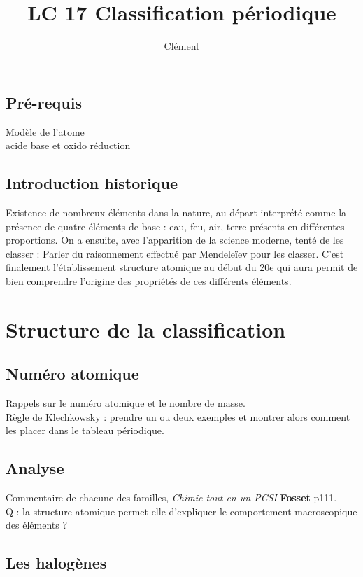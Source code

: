 \documentclass[12pt,prb,aps,epsf]{article}
\begin{document}
	
	\title{LC 17 Classification périodique}
	\author{Clément}
	
	\maketitle
	
	\tableofcontents
	
	\pagebreak
	
	
\subsection{Pré-requis}
Modèle de l'atome\\
acide base et oxido réduction

\subsection{Introduction historique}
Existence de nombreux éléments dans la nature, au départ interprété comme la présence de quatre éléments de base : eau, feu, air, terre présents en différentes proportions. On a ensuite, avec l'apparition de la science moderne, tenté de les classer : Parler du raisonnement effectué par Mendeleïev pour les classer. C'est finalement l'établissement structure atomique au début du 20e qui aura permit de bien comprendre l'origine des propriétés de ces différents éléments.

\section{Structure de la classification}
\subsection{Numéro atomique}
Rappels sur le numéro atomique et le nombre de masse. \\
Règle de Klechkowsky : prendre un ou deux exemples et montrer alors comment les placer dans le tableau périodique.

\subsection{Analyse}
Commentaire de chacune des familles, \textit{Chimie tout en un PCSI} \textbf{Fosset} p111.\\
Q : la structure atomique permet elle d'expliquer le comportement macroscopique des éléments ?
\subsection{Les halogènes}
\end{document}
